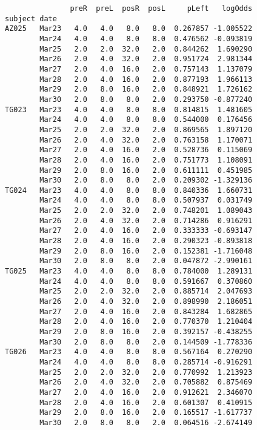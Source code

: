 \documentclass[11pt]{article}
\begin{document}
    
    \begin{verbatim}
               preR  preL  posR  posL     pLeft   logOdds
subject date                                             
AZ025   Mar23   4.0   4.0   8.0   8.0  0.267857 -1.005522
        Mar24   4.0   4.0   8.0   8.0  0.476562 -0.093819
        Mar25   2.0   2.0  32.0   2.0  0.844262  1.690290
        Mar26   2.0   4.0  32.0   2.0  0.951724  2.981344
        Mar27   2.0   4.0  16.0   2.0  0.757143  1.137079
        Mar28   2.0   4.0  16.0   2.0  0.877193  1.966113
        Mar29   2.0   8.0  16.0   2.0  0.848921  1.726162
        Mar30   2.0   8.0   8.0   2.0  0.293750 -0.877240
TG023   Mar23   4.0   4.0   8.0   8.0  0.814815  1.481605
        Mar24   4.0   4.0   8.0   8.0  0.544000  0.176456
        Mar25   2.0   2.0  32.0   2.0  0.869565  1.897120
        Mar26   2.0   4.0  32.0   2.0  0.763158  1.170071
        Mar27   2.0   4.0  16.0   2.0  0.528736  0.115069
        Mar28   2.0   4.0  16.0   2.0  0.751773  1.108091
        Mar29   2.0   8.0  16.0   2.0  0.611111  0.451985
        Mar30   2.0   8.0   8.0   2.0  0.209302 -1.329136
TG024   Mar23   4.0   4.0   8.0   8.0  0.840336  1.660731
        Mar24   4.0   4.0   8.0   8.0  0.507937  0.031749
        Mar25   2.0   2.0  32.0   2.0  0.748201  1.089043
        Mar26   2.0   4.0  32.0   2.0  0.714286  0.916291
        Mar27   2.0   4.0  16.0   2.0  0.333333 -0.693147
        Mar28   2.0   4.0  16.0   2.0  0.290323 -0.893818
        Mar29   2.0   8.0  16.0   2.0  0.152381 -1.716048
        Mar30   2.0   8.0   8.0   2.0  0.047872 -2.990161
TG025   Mar23   4.0   4.0   8.0   8.0  0.784000  1.289131
        Mar24   4.0   4.0   8.0   8.0  0.591667  0.370860
        Mar25   2.0   2.0  32.0   2.0  0.885714  2.047693
        Mar26   2.0   4.0  32.0   2.0  0.898990  2.186051
        Mar27   2.0   4.0  16.0   2.0  0.843284  1.682865
        Mar28   2.0   4.0  16.0   2.0  0.770370  1.210404
        Mar29   2.0   8.0  16.0   2.0  0.392157 -0.438255
        Mar30   2.0   8.0   8.0   2.0  0.144509 -1.778336
TG026   Mar23   4.0   4.0   8.0   8.0  0.567164  0.270290
        Mar24   4.0   4.0   8.0   8.0  0.285714 -0.916291
        Mar25   2.0   2.0  32.0   2.0  0.770992  1.213923
        Mar26   2.0   4.0  32.0   2.0  0.705882  0.875469
        Mar27   2.0   4.0  16.0   2.0  0.912621  2.346070
        Mar28   2.0   4.0  16.0   2.0  0.601307  0.410915
        Mar29   2.0   8.0  16.0   2.0  0.165517 -1.617737
        Mar30   2.0   8.0   8.0   2.0  0.064516 -2.674149
    \end{verbatim}
\end{document}
